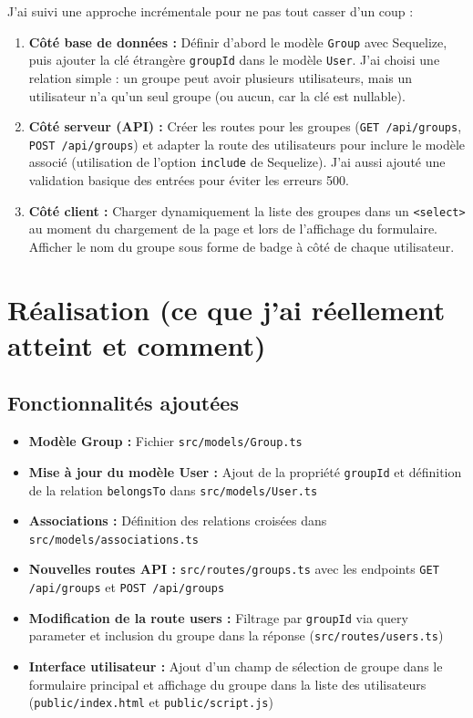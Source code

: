 \documentclass[11pt,a4paper]{article}
\begin{document}
J'ai suivi une approche incrémentale pour ne pas tout casser d'un coup :
\begin{enumerate}
    \item \textbf{Côté base de données :} Définir d'abord le modèle \texttt{Group} avec Sequelize, puis ajouter la clé étrangère \texttt{groupId} dans le modèle \texttt{User}. J'ai choisi une relation simple : un groupe peut avoir plusieurs utilisateurs, mais un utilisateur n'a qu'un seul groupe (ou aucun, car la clé est nullable).
    \item \textbf{Côté serveur (API) :} Créer les routes pour les groupes (\texttt{GET /api/groups}, \texttt{POST /api/groups}) et adapter la route des utilisateurs pour inclure le modèle associé (utilisation de l'option \texttt{include} de Sequelize). J'ai aussi ajouté une validation basique des entrées pour éviter les erreurs 500.
    \item \textbf{Côté client :} Charger dynamiquement la liste des groupes dans un \texttt{<select>} au moment du chargement de la page et lors de l'affichage du formulaire. Afficher le nom du groupe sous forme de badge à côté de chaque utilisateur.
\end{enumerate}

\section{Réalisation (ce que j'ai réellement atteint et comment)}
\subsection{Fonctionnalités ajoutées}
\begin{itemize}
    \item \textbf{Modèle Group :} Fichier \texttt{src/models/Group.ts}
    \item \textbf{Mise à jour du modèle User :} Ajout de la propriété \texttt{groupId} et définition de la relation \texttt{belongsTo} dans \texttt{src/models/User.ts}
    \item \textbf{Associations :} Définition des relations croisées dans \texttt{src/models/associations.ts}
    \item \textbf{Nouvelles routes API :} \texttt{src/routes/groups.ts} avec les endpoints \texttt{GET /api/groups} et \texttt{POST /api/groups}
    \item \textbf{Modification de la route users :} Filtrage par \texttt{groupId} via query parameter et inclusion du groupe dans la réponse (\texttt{src/routes/users.ts})
    \item \textbf{Interface utilisateur :} Ajout d'un champ de sélection de groupe dans le formulaire principal et affichage du groupe dans la liste des utilisateurs (\texttt{public/index.html} et \texttt{public/script.js})
\end{itemize}
\end{document}
